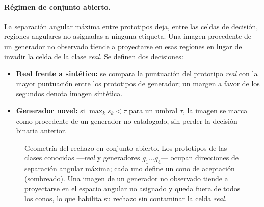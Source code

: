 \documentclass[11pt,a4paper]{article}
\theoremstyle{plain}
\begin{document}
\paragraph{Régimen de conjunto abierto.} La separación angular máxima
entre prototipos deja, entre las celdas de decisión, regiones angulares
no asignadas a ninguna etiqueta. Una imagen procedente de un generador
no observado tiende a proyectarse en esas regiones en lugar de invadir
la celda de la clase \emph{real}. Se definen dos decisiones:

\begin{itemize}
\item \textbf{Real frente a sintético:} se compara la puntuación del
prototipo \emph{real} con la mayor puntuación entre los prototipos de
generador; un margen a favor de los segundos denota imagen sintética.
\item \textbf{Generador novel:} si $\max_k s_k < \tau$ para un umbral
$\tau$, la imagen se marca como procedente de un generador no
catalogado, sin perder la decisión binaria anterior.
\end{itemize}

\begin{figure}[t]
\centering
{}
\caption{Geometría del rechazo en conjunto abierto. Los prototipos de
las clases conocidas ---\emph{real} y generadores $g_1\dots g_4$---
ocupan direcciones de separación angular máxima; cada uno define un cono
de aceptación (sombreado). Una imagen de un generador no observado tiende
a proyectarse en el espacio angular no asignado y queda fuera de todos
los conos, lo que habilita su rechazo sin contaminar la celda
\emph{real}.}
\label{fig:openset}
\end{figure}
\end{document}
